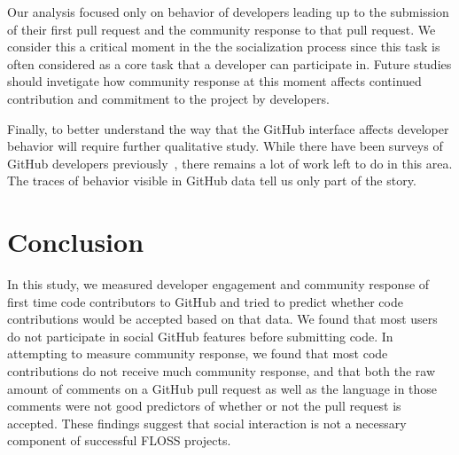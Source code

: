 \documentclass{sigchi}
\begin{document}
Our analysis focused only on behavior of developers leading up to the submission
of their first pull request and the community response to that pull request. We
consider this a critical moment in the the socialization process since this task
is often considered as a core task that a developer can participate in. Future
studies should invetigate how community response at this moment affects
continued contribution and commitment to the project by developers.

Finally, to better understand the way that the GitHub interface affects
developer behavior will require further qualitative study. While there have been
surveys of GitHub developers previously~\cite{mcdonald_performance_2013}, there
remains a lot of work left to do in this area. The traces of behavior visible in
GitHub data tell us only part of the story.

\section{Conclusion}

In this study, we measured developer engagement and community response of first
time code contributors to GitHub and tried to predict whether code contributions
would be accepted based on that data. We found that most users do not
participate in social GitHub features before submitting code. In attempting to
measure community response, we found that most code contributions do not receive
much community response, and that both the raw amount of comments on a GitHub
pull request as well as the language in those comments were not good predictors
of whether or not the pull request is accepted. These findings suggest that
social interaction is not a necessary component of successful FLOSS projects.

\balance

%
%


\end{document}
